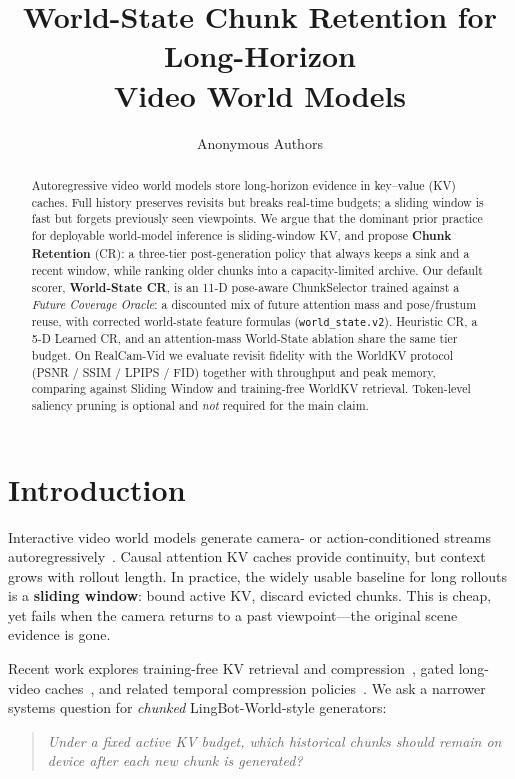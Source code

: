 \documentclass{article}
\title{World-State Chunk Retention for Long-Horizon\\
Video World Models}
\author{Anonymous Authors}
\begin{document}
\maketitle

\begin{abstract}
Autoregressive video world models store long-horizon evidence in key--value
(KV) caches.  Full history preserves revisits but breaks real-time budgets;
a sliding window is fast but forgets previously seen viewpoints.
We argue that the dominant prior practice for deployable world-model
inference is sliding-window KV, and propose \textbf{Chunk Retention} (CR):
a three-tier post-generation policy that always keeps a sink and a recent
window, while ranking older chunks into a capacity-limited archive.
Our default scorer, \textbf{World-State CR}, is an 11-D pose-aware
ChunkSelector trained against a \emph{Future Coverage Oracle}: a discounted
mix of future attention mass and pose/frustum reuse, with corrected
world-state feature formulas (\texttt{world\_state.v2}).
Heuristic CR, a 5-D Learned CR, and an attention-mass World-State ablation
share the same tier budget.  On RealCam-Vid we evaluate revisit fidelity
with the WorldKV protocol (PSNR / SSIM / LPIPS / FID) together with
throughput and peak memory, comparing against Sliding Window and
training-free WorldKV retrieval.  Token-level saliency pruning is optional
and \emph{not} required for the main claim.
\end{abstract}

\section{Introduction}
\label{sec:intro}

Interactive video world models generate camera- or action-conditioned
streams autoregressively~\citep{huang2025selfforcing,he2025matrix,
robbyant2026lingbot}.  Causal attention KV caches provide continuity, but
context grows with rollout length.  In practice, the widely usable baseline
for long rollouts is a \textbf{sliding window}: bound active KV, discard
evicted chunks.  This is cheap, yet fails when the camera returns to a past
viewpoint---the original scene evidence is gone.

Recent work explores training-free KV retrieval and
compression~\citep{yi2026worldkv}, gated long-video
caches~\citep{meng2026tether}, and related temporal compression
policies~\citep{luo2026future,samuel2026fastar}.  We ask a narrower systems
question for \emph{chunked} LingBot-World-style generators:
\begin{quote}
\emph{Under a fixed active KV budget, which historical chunks should remain
on device after each new chunk is generated?}
\end{quote}
\end{document}
